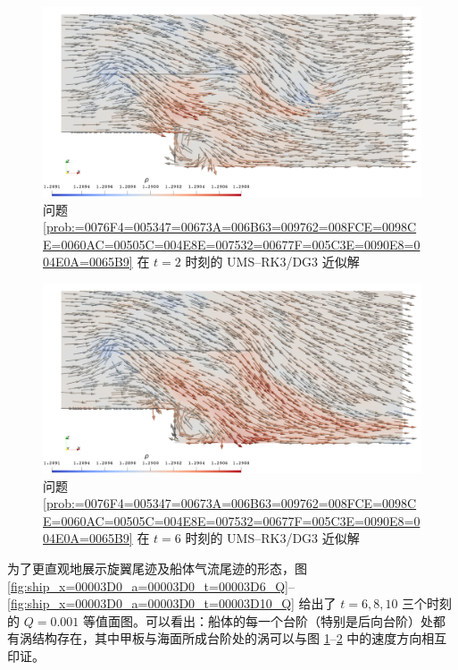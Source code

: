 \begin{figure}[h!]
\begin{centering}
\includegraphics[width=1\textwidth,height=0.4\textheight,keepaspectratio]{figures/ship/x=0/Frame20}
\par\end{centering}
\caption{\label{fig:ship_x=00003D0_a=00003D0_t=00003D2_p=00003D3}问题 \ref{prob:=0076F4=005347=00673A=006B63=009762=008FCE=0098CE=0060AC=00505C=004E8E=007532=00677F=005C3E=0090E8=004E0A=0065B9}
在 $t=2$ 时刻的 UMS–RK3/DG3 近似解}
\end{figure}

\begin{figure}[h!]
\begin{centering}
\includegraphics[width=1\textwidth,height=0.4\textheight,keepaspectratio]{figures/ship/x=0/Frame60}
\par\end{centering}
\caption{\label{fig:ship_x=00003D0_a=00003D0_t=00003D6_p=00003D3}问题 \ref{prob:=0076F4=005347=00673A=006B63=009762=008FCE=0098CE=0060AC=00505C=004E8E=007532=00677F=005C3E=0090E8=004E0A=0065B9}
在 $t=6$ 时刻的 UMS–RK3/DG3 近似解}
\end{figure}

为了更直观地展示旋翼尾迹及船体气流尾迹的形态，图 \ref{fig:ship_x=00003D0_a=00003D0_t=00003D6_Q}–\ref{fig:ship_x=00003D0_a=00003D0_t=00003D10_Q}
给出了 $t=6,8,10$ 三个时刻的 $Q=0.001$ 等值面图。可以看出：船体的每一个台阶（特别是后向台阶）处都有涡结构存在，其中甲板与海面所成台阶处的涡可以与图
\ref{fig:ship_x=00003D0_a=00003D0_t=00003D2_p=00003D3}–\ref{fig:ship_x=00003D0_a=00003D0_t=00003D6_p=00003D3}
中的速度方向相互印证。

